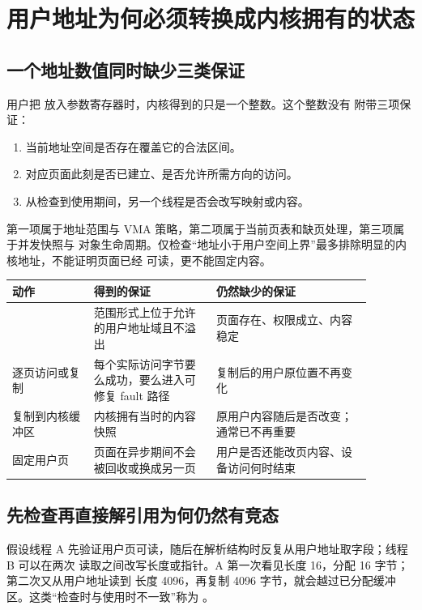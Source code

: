 \section{用户地址为何必须转换成内核拥有的状态}

\subsection{一个地址数值同时缺少三类保证}

用户把  放入参数寄存器时，内核得到的只是一个整数。这个整数没有
附带三项保证：

\begin{enumerate}
\tightlist
\item 当前地址空间是否存在覆盖它的合法区间。
\item 对应页面此刻是否已建立、是否允许所需方向的访问。
\item 从检查到使用期间，另一个线程是否会改写映射或内容。
\end{enumerate}

第一项属于地址范围与 VMA 策略，第二项属于当前页表和缺页处理，第三项属于并发快照与
对象生命周期。仅检查“地址小于用户空间上界”最多排除明显的内核地址，不能证明页面已经
可读，更不能固定内容。

\begin{longtable}{|L{0.20\linewidth}|L{0.30\linewidth}|L{0.38\linewidth}|}
\hline
动作 & 得到的保证 & 仍然缺少的保证 \\ \hline
{} & 范围形式上位于允许的用户地址域且不溢出 & 页面存在、权限成立、内容稳定 \\ \hline
逐页访问或复制 & 每个实际访问字节要么成功，要么进入可修复 fault 路径 & 复制后的用户原位置不再变化 \\ \hline
复制到内核缓冲区 & 内核拥有当时的内容快照 & 原用户内容随后是否改变；通常已不再重要 \\ \hline
固定用户页 & 页面在异步期间不会被回收或换成另一页 & 用户是否还能改页内容、设备访问何时结束 \\ \hline
\end{longtable}

\subsection{先检查再直接解引用为何仍然有竞态}

假设线程 A 先验证用户页可读，随后在解析结构时反复从用户地址取字段；线程 B 可以在两次
读取之间改写长度或指针。A 第一次看见长度 16，分配 16 字节；第二次又从用户地址读到
长度 4096，再复制 4096 字节，就会越过已分配缓冲区。这类“检查时与使用时不一致”称为
。

